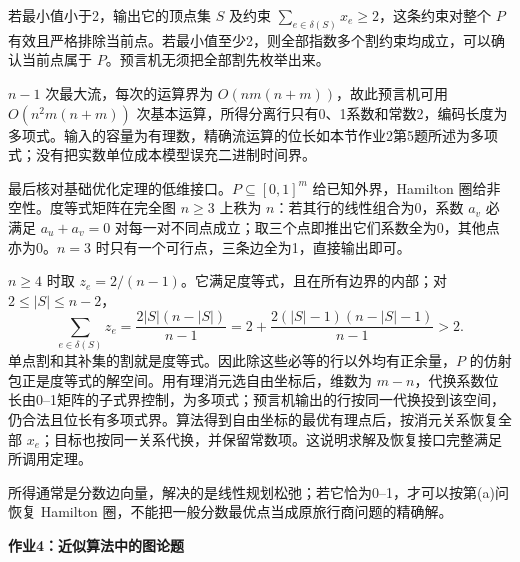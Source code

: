\begin{solution}
若最小值小于2，输出它的顶点集 $S$ 及约束 $\sum_{e\in\delta(S)}x_e\ge2$，这条约束对整个 $P$ 有效且严格排除当前点。若最小值至少2，则全部指数多个割约束均成立，可以确认当前点属于 $P$。预言机无须把全部割先枚举出来。

$n-1$ 次最大流，每次的运算界为 $O(nm(n+m))$，故此预言机可用 $O(n^2m(n+m))$ 次基本运算，所得分离行只有0、1系数和常数2，编码长度为多项式。输入的容量为有理数，精确流运算的位长如本节作业2第5题所述为多项式；没有把实数单位成本模型误充二进制时间界。

最后核对基础优化定理的低维接口。$P\subseteq[0,1]^m$ 给已知外界，Hamilton 圈给非空性。度等式矩阵在完全图 $n\ge3$ 上秩为 $n$：若其行的线性组合为0，系数 $a_v$ 必满足 $a_u+a_v=0$ 对每一对不同点成立；取三个点即推出它们系数全为0，其他点亦为0。$n=3$ 时只有一个可行点，三条边全为1，直接输出即可。

$n\ge4$ 时取 $z_e=2/(n-1)$。它满足度等式，且在所有边界的内部；对 $2\le |S|\le n-2$，
\[
 \sum_{e\in\delta(S)}z_e
 =\frac{2|S|(n-|S|)}{n-1}
 =2+\frac{2(|S|-1)(n-|S|-1)}{n-1}>2.
\]
单点割和其补集的割就是度等式。因此除这些必等的行以外均有正余量，$P$ 的仿射包正是度等式的解空间。用有理消元选自由坐标后，维数为 $m-n$，代换系数位长由0--1矩阵的子式界控制，为多项式；预言机输出的行按同一代换投到该空间，仍合法且位长有多项式界。算法得到自由坐标的最优有理点后，按消元关系恢复全部 $x_e$；目标也按同一关系代换，并保留常数项。这说明求解及恢复接口完整满足所调用定理。

所得通常是分数边向量，解决的是线性规划松弛；若它恰为0--1，才可以按第(a)问恢复 Hamilton 圈，不能把一般分数最优点当成原旅行商问题的精确解。
\end{solution}

\par\addvspace{7pt}\noindent\textbf{作业4：近似算法中的图论题}

